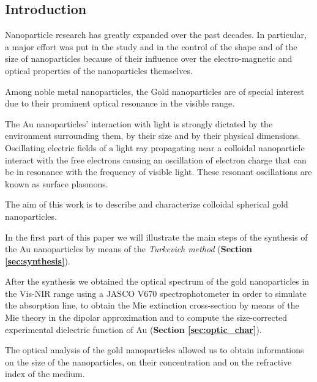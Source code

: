 \documentclass[twocolumn]{article}
\title{}
\author{}
\date{}
\begin{document}
\thispagestyle{fancy}

\thispagestyle{empty}

\tableofcontents

\noindent\makebox[\linewidth]{\color{linescolor} \rule[-0.2cm]{0.85\paperwidth}{1pt}}
\noindent\makebox[\linewidth]{\color{linescolor} \rule[0.3cm]{0.85\paperwidth}{1.2 pt}}


\begin{multicols}{2}
\section{Introduction}
\noindent
Nanoparticle research has greatly expanded over the past decades. 
In particular, a major effort was put in the study and in the control of the shape and of the size of nanoparticles because of their influence over the electro-magnetic and optical properties of the nanoparticles themselves.

Among noble metal nanoparticles, the Gold nanoparticles are of special interest due to their prominent optical resonance in the visible range.

The Au nanoparticles' interaction with light is strongly dictated by the environment surrounding them, by their size and by their physical dimensions. Oscillating electric fields of a light ray propagating near a colloidal nanoparticle interact with the free electrons causing an oscillation of electron charge that can be in resonance with the frequency of visible light. These resonant oscillations are known as surface plasmons. 

The aim of this work is to describe and characterize colloidal spherical gold nanoparticles. 

In the first part of this paper we will illustrate the main steps of the synthesis of the Au nanoparticles by means of the \textit{Turkevich method} (\textbf{Section \ref{sec:synthesis}}). 

After the synthesis we obtained the optical spectrum of the gold nanoparticles in the Vis-NIR range using a JASCO V670 spectrophotometer in order to simulate the absorption line, to obtain the Mie extinction cross-section by means of the Mie theory in the dipolar approximation and to compute the size-corrected experimental dielectric function of Au (\textbf{Section \ref{sec:optic_char}}). 

The optical analysis of the gold nanoparticles allowed us to obtain informations on the size of the nanoparticles, on their concentration and on the refractive index of the medium.


\end{multicols}
\end{document}
